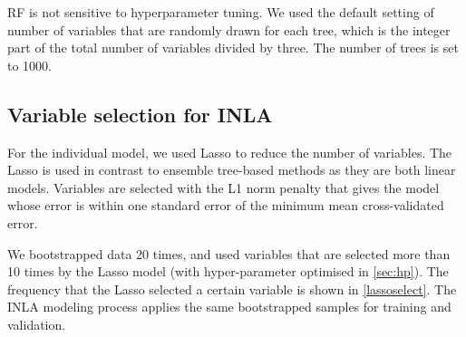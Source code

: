 \documentclass{article}
\begin{document}
RF is not sensitive to hyperparameter tuning. We used the default setting of number of variables that are randomly drawn for each tree\citep{breiman2001random}, which is the integer part of the total number of variables divided by three. The number of trees is set to 1000. 


\subsection{Variable selection for INLA} 

For the individual model, we used Lasso to reduce the number of variables. The Lasso is used in contrast to ensemble tree-based methods as they are both linear models. 
Variables are selected with the L1 norm penalty that gives the model whose error is within one standard error of the minimum mean cross-validated error.

We bootstrapped data 20 times, and used variables that are selected more than 10 times by the Lasso model (with hyper-parameter optimised in \cref{sec:hp}). The frequency that the Lasso selected a certain variable is shown in \cref{lassoselect}. The INLA modeling process applies the same bootstrapped samples for training and validation. 
\end{document}
